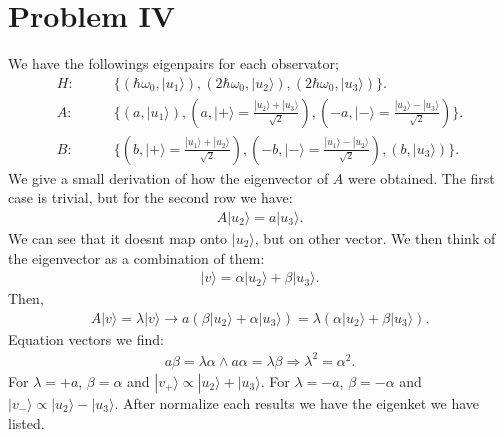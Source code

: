 \documentclass[letterpaper,11pt,twoside]{article}
\newcommand{\ket}[1]{|#1\rangle}
\begin{document}
\section*{Problem IV}
We have the followings eigenpairs for each observator;
\begin{align*}
  H:\qquad&\{(\hbar\omega_0,\ket{u_1}),(2\hbar\omega_0,\ket{u_2}),(2\hbar\omega_0,\ket{u_3})\}.\\
  A:\qquad&\{(a,\ket{u_1}),(a,\ket{+}=\frac{\ket{u_2}+\ket{u_3}}{\sqrt{2}}),(-a,\ket{-}=\frac{\ket{u_2}-\ket{u_3}}{\sqrt{2}})\}.\\
  B:\qquad&\{(b,\ket{+}=\frac{\ket{u_1}+\ket{u_2}}{\sqrt{2}}),(-b,\ket{-}=\frac{\ket{u_1}-\ket{u_2}}{\sqrt{2}}),(b,\ket{u_3})\}.
\end{align*}
We give a small derivation of how the eigenvector of $A$ were obtained. The first case is trivial, but for the second row we have:
\begin{align*}
  A\ket{u_2}=a\ket{u_3}.
\end{align*}
We can see that it doesnt map onto $\ket{u_2}$, but on other vector. We then think of the eigenvector as a combination of them:
\begin{align*}
  \ket{v}=\alpha\ket{u_2}+\beta\ket{u_3}.
\end{align*}
Then,
\begin{align*}
  A\ket{v}=\lambda\ket{v}\longrightarrow a(\beta\ket{u_2}+\alpha\ket{u_3})=\lambda(\alpha\ket{u_2}+\beta\ket{u_3}).
\end{align*}
Equation vectors we find:
\begin{align*}
  a\beta=\lambda\alpha\land a\alpha=\lambda\beta\Longrightarrow\lambda^2=\alpha^2.
\end{align*}
For $\lambda=+a$, $\beta=\alpha$ and $\ket{v_+}\propto\ket{u_2}+\ket{u_3}$. For $\lambda=-a$, $\beta=-\alpha$ and $\ket{v_-}\propto\ket{u_2}-\ket{u_3}$. After normalize each 
results we have the eigenket we have listed.
\end{document}
